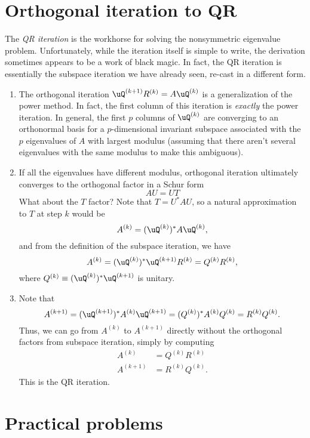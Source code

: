 \documentclass[12pt, leqno]{article} %
\begin{document}

\section{Orthogonal iteration to QR}

The {\em QR iteration} is the workhorse for solving the nonsymmetric
eigenvalue problem.  Unfortunately, while the iteration itself is
simple to write, the derivation sometimes appears to be a work of
black magic.  In fact, the QR iteration is essentially the subspace
iteration we have already seen, re-cast in a different form.

\begin{enumerate}
\item
  The orthogonal iteration $\uQ^{(k+1)} R^{(k)} = A \uQ^{(k)}$ is a
  generalization of the power method.  In fact, the first column of
  this iteration is {\em exactly} the power iteration.  In general,
  the first $p$ columns of $\uQ^{(k)}$ are converging to an orthonormal
  basis for a $p$-dimensional invariant subspace associated with the
  $p$ eigenvalues of $A$ with largest modulus (assuming that there
  aren't several eigenvalues with the same modulus to make this
  ambiguous).
\item
  If all the eigenvalues have different modulus, orthogonal iteration
  ultimately converges to the orthogonal factor in a Schur form
  \[
    AU = UT
  \]
  What about the $T$ factor?  Note that $T = U^* A U$, so a natural
  approximation to $T$ at step $k$ would be
  \[
    A^{(k)} = (\uQ^{(k)})^* A \uQ^{(k)},
  \]
  and from the definition of the subspace iteration, we have
  \[
    A^{(k)} = (\uQ^{(k)})^* \uQ^{(k+1)} R^{(k)} = Q^{(k)} R^{(k)},
  \]
  where $Q^{(k)} \equiv (\uQ^{(k)})^* \uQ^{(k+1)}$ is unitary.
\item
  Note that
  \[
    A^{(k+1)}
    = (\uQ^{(k+1)})^* A^{(k)} \uQ^{(k+1)}
    = (Q^{(k)})^* A^{(k)} Q^{(k)}
    = R^{(k)} Q^{(k)}.
  \]
  Thus, we can go from $A^{(k)}$ to $A^{(k+1)}$ directly without
  the orthogonal factors from subspace iteration, simply by computing
  \begin{align*}
    A^{(k)} &= Q^{(k)} R^{(k)} \\
    A^{(k+1)} &= R^{(k)} Q^{(k)}.
  \end{align*}
  This is the QR iteration.
\end{enumerate}

\section{Practical problems}
\end{document}

